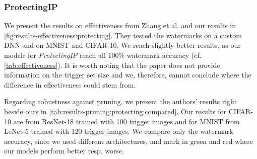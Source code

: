 \subsubsection{ProtectingIP} \label{sec:compare-results:protecting}

We present the results on effectiveness from Zhang et al. \cite{zhang_protecting_2018} and our results in \cref{fig:results-effectiveness:protecting}. They tested the watermarks on a custom DNN and on MNIST and CIFAR-10.
We reach slightly better results, as our models for \textit{ProtectingIP} reach all 100\% watermark accuracy (cf. \cref{tab:effectiveness}). It is worth noting that the paper does not provide information on the trigger set size and we, therefore, cannot conclude where the difference in effectiveness could stem from.




Regarding robustness against pruning, we present the authors' results right beside ours in \cref{tab:results-pruning:protecting:compared}. Our results for CIFAR-10 are from ResNet-18 trained with 100 trigger images and for MNIST from LeNet-5 trained with 120 trigger images. We compare only the watermark accuracy, since we used different architectures, and mark in green and red where our models perform better resp. worse.

